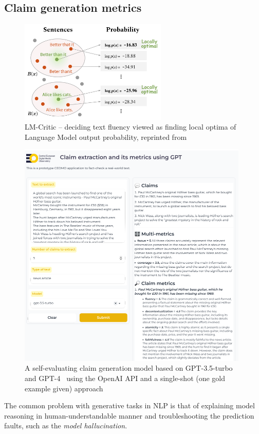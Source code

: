 \subsection{Claim generation metrics}
\label{metrics}

\begin{figure}
    \includegraphics[width=7cm]{fig/lm_critics.png}
    \caption{\textsf{LM-Critic} -- deciding text fluency viewed as finding local optima of Language Model output probability, reprinted from~\cite{yasunaga-etal-2021-lm}}
    \label{fig:lmcritic}
\end{figure}
\label{sec:metrics}

\begin{figure}
    \includegraphics[width=11cm]{fig/gptext.pdf}
    \caption{A self-evaluating claim generation model based on GPT-3.5-turbo and GPT-4~\cite{gpt4} using the \textsf{OpenAI API} and a single-shot (one gold example given) approach}
    \label{fig:gptext}
\end{figure}
\label{sec:metrics}
The common problem with generative tasks in NLP is that of explaining model reasoning in human-understandable manner and troubleshooting the prediction faults, such as the \textit{model hallucination}.

